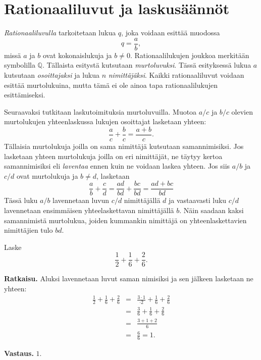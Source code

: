 \chapter{Rationaaliluvut ja laskusäännöt}

\emph{Rationaaliluvulla} tarkoitetaan lukua $q$, joka voidaan esittää muodossa
\[
q=\frac{a}{b}, 
\]
missä $a$ ja $b$ ovat kokonaislukuja ja $b\neq 0$. Rationaalilukujen joukkoa merkitään symbolilla $\mathbb{Q}$. Tällaista esitystä kutsutaan \emph{murtoluvuksi}. Tässä esityksessä lukua $a$ kutsutaan \emph{osoittajaksi} ja lukua $n$ \emph{nimittäjäksi}. Kaikki rationaaliluvut voidaan esittää murtolukuina, mutta tämä ei ole ainoa tapa rationaalilukujen esittämiseksi. 


Seuraavaksi tutkitaan laskutoimituksia murtoluvuilla. Muotoa $a/c$ ja $b/c$ olevien murtolukujen yhteenlaskussa lukujen osoittajat lasketaan yhteen:
\[
\frac{a}{c} + \frac{b}{c} = \frac{a+b}{c}.
\]
Tällaisia murtolukuja joilla on sama nimittäjä kutsutaan samannimisiksi. Jos lasketaan yhteen murtolukuja joilla on eri nimittäjät, ne täytyy kertoa samannimisiksi eli \emph{laventaa} ennen kuin ne voidaan laskea yhteen. Jos siis $a/b$ ja $c/d$ ovat murtolukuja ja $b\neq d$, lasketaan
\[
\frac{a}{b} + \frac{c}{d} = \frac{ad}{bd} + \frac{bc}{bd} = \frac{ad+bc}{bd}
\]
Tässä luku $a/b$ lavennetaan luvun $c/d$ nimittäjällä $d$ ja vastaavasti luku $c/d$ lavennetaan ensimmäisen yhteelaskettavan nimittäjällä $b$. Näin saadaan kaksi samannimistä murtolukua, joiden kummankin nimittäjä on yhteenlaskettavien nimittäjien tulo $bd$.

\begin{esimerkki}
Laske
\[
\frac{1}{2} + \frac{1}{6} + \frac{2}{6}.
\]

{\bf Ratkaisu.}
Aluksi lavennetaan luvut saman nimisiksi ja sen jälkeen lasketaan ne yhteen:
\begin{eqnarray*}
\frac{1}{2} + \frac{1}{6} + \frac{2}{6}
&=&
\frac{3\cdot 1}{\cdot 2} + \frac{1}{6} + \frac{2}{6}\\
&=&
\frac{3}{6} + \frac{1}{6} + \frac{2}{6}\\
&=& \frac{3+1+2}{6}\\ &=& \frac{6}{6} = 1.
\end{eqnarray*}

{\bf Vastaus.} $1$.

\end{esimerkki}

